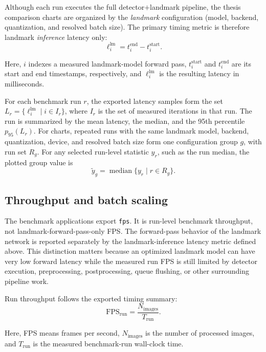 Although each run executes the full detector$+$landmark pipeline, the thesis
comparison charts are organized by the \emph{landmark} configuration
(model, backend, quantization, and resolved batch size). The primary timing
metric is therefore landmark \emph{inference} latency only:
\begin{equation}
\ell_i^{\mathrm{lm}} = t_i^{\mathrm{end}} - t_i^{\mathrm{start}}.
\end{equation}

Here, \(i\) indexes a measured landmark-model forward pass,
\(t_i^{\mathrm{start}}\) and \(t_i^{\mathrm{end}}\) are its start and end
timestamps, respectively, and \(\ell_i^{\mathrm{lm}}\) is the resulting latency in
milliseconds.

For each benchmark run \(r\), the exported latency samples form the set
\(L_r=\{\ell_i^{\mathrm{lm}}\mid i \in I_r\}\), where \(I_r\) is the set of
measured iterations in that run. The run is summarized by the mean latency, the
median, and the 95th percentile \(p_{95}(L_r)\). For charts, repeated runs with
the same landmark model, backend, quantization, device, and resolved batch size
form one configuration group \(g\), with run set \(R_g\). For any selected
run-level statistic \(y_r\), such as the run median, the plotted group value is
\begin{equation}
\tilde{y}_g = \operatorname{median}\{y_r \mid r \in R_g\}.
\end{equation}

\subsection{Throughput and batch scaling}

The benchmark applications export \texttt{fps}. It is run-level benchmark
throughput, not landmark-forward-pass-only FPS. The forward-pass behavior of the
landmark network is reported separately by the landmark-inference latency metric
defined above. This distinction matters because an optimized landmark model can
have very low forward latency while the measured run FPS is still limited by
detector execution, preprocessing, postprocessing, queue flushing, or other
surrounding pipeline work.

Run throughput follows the exported timing summary:
\begin{equation}
\mathrm{FPS}_{\text{run}} = \frac{N_{\text{images}}}{T_{\text{run}}}.
\end{equation}

Here, FPS means frames per second, \(N_{\text{images}}\) is the number of
processed images, and \(T_{\text{run}}\) is the measured benchmark-run wall-clock
time.

